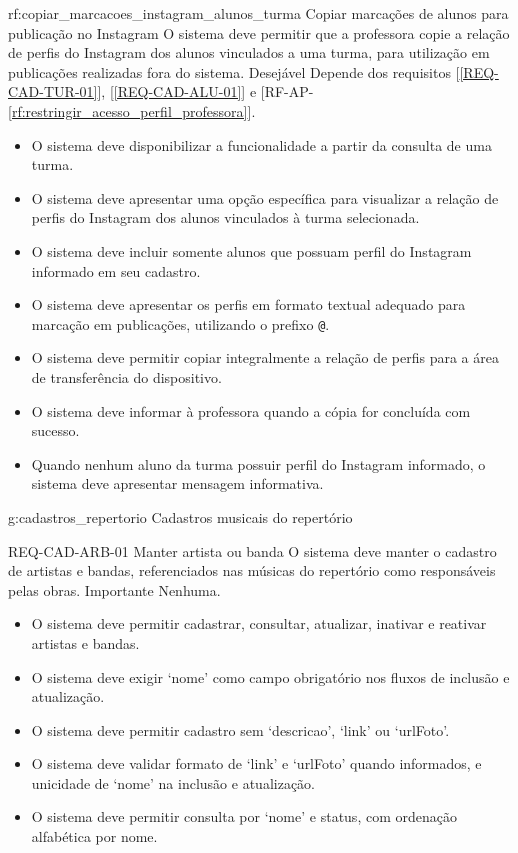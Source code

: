 \reqfuncfull
{rf:copiar_marcacoes_instagram_alunos_turma}
{Copiar marcações de alunos para publicação no Instagram}
{O sistema deve permitir que a professora copie a relação de perfis do Instagram dos alunos vinculados a uma turma, para utilização em publicações realizadas fora do sistema.}
{Desejável}
{Depende dos requisitos [\ref{REQ-CAD-TUR-01}], [\ref{REQ-CAD-ALU-01}] e [RF-AP-\ref{rf:restringir_acesso_perfil_professora}].}
{\begin{itemize}[leftmargin=0.6cm]
    \item O sistema deve disponibilizar a funcionalidade a partir da consulta de uma turma.
    \item O sistema deve apresentar uma opção específica para visualizar a relação de perfis do Instagram dos alunos vinculados à turma selecionada.
    \item O sistema deve incluir somente alunos que possuam perfil do Instagram informado em seu cadastro.
    \item O sistema deve apresentar os perfis em formato textual adequado para marcação em publicações, utilizando o prefixo \texttt{@}.
    \item O sistema deve permitir copiar integralmente a relação de perfis para a área de transferência do dispositivo.
    \item O sistema deve informar à professora quando a cópia for concluída com sucesso.
    \item Quando nenhum aluno da turma possuir perfil do Instagram informado, o sistema deve apresentar mensagem informativa.
\end{itemize}}

\rfgruporeq
{g:cadastros_repertorio}
{Cadastros musicais do repertório}


\reqfunccad
{REQ-CAD-ARB-01 Manter artista ou banda}
{O sistema deve manter o cadastro de artistas e bandas, referenciados nas músicas do repertório como responsáveis pelas obras.}
{Importante}
{Nenhuma.}
{\begin{itemize}[leftmargin=0.6cm]
    \item O sistema deve permitir cadastrar, consultar, atualizar, inativar e reativar artistas e bandas.
    \item O sistema deve exigir `nome' como campo obrigatório nos fluxos de inclusão e atualização.
    \item O sistema deve permitir cadastro sem `descricao', `link' ou `urlFoto'.
    \item O sistema deve validar formato de `link' e `urlFoto' quando informados, e unicidade de `nome' na inclusão e atualização.
    \item O sistema deve permitir consulta por `nome' e status, com ordenação alfabética por nome.
\end{itemize}}

